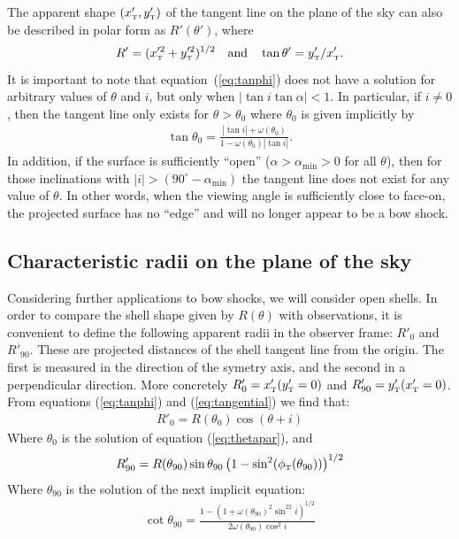 The apparent shape \((x'_{\mathrm{\scriptscriptstyle T}}, y'_{\mathrm{\scriptscriptstyle T}})\) of the tangent line on the plane
of the sky can also be described in polar form as \(R'(\theta')\),
where
\begin{equation}
  \label{eq:R-prime-theta-prime}
  R' = (x'^2_{\mathrm{\scriptscriptstyle T}}+ y'^2_{\mathrm{\scriptscriptstyle T}})^{1/2} 
  \quad \text{and} \quad
  \tan\theta' = y'_{\mathrm{\scriptscriptstyle T}} / x'_{\mathrm{\scriptscriptstyle T}}.
\end{equation}
It is important to note that equation~(\ref{eq:tanphi}) does not have
a solution for arbitrary values of $\theta$ and $i$, but only when
$|\tan i\tan\alpha|<1$. In particular, if $i\neq 0$, then the tangent
line only exists for \(\theta > \theta_{0}\) where \(\theta_{0}\) is
given implicitly by
\begin{align}
\tan\theta_{0} = \frac{|\tan i| + \omega(\theta_{0})}{1-\omega(\theta_{0}) |\tan i|} . 
\label{eq:thetapar}
\end{align}
In addition, if the surface is sufficiently ``open''
(\(\alpha > \alpha_{\mathrm{min}} > 0\) for all \(\theta\)), then for
those inclinations with
\(\vert i\vert > (90^\circ - \alpha_{\mathrm{min}}) \) the tangent
line does not exist for any value of \(\theta\).  In other words, when
the viewing angle is sufficiently close to face-on, the projected
surface has no ``edge'' and will no longer appear to be a bow shock.

\subsection{Characteristic radii on the plane of the sky}

Considering further applications to bow shocks, we will consider open shells. In order to compare the shell shape given by $R(\theta)$ with observations,
it is convenient to define the following apparent radii in the observer frame: $R'_{0}$ and $R'_{90}$. These are projected distances of the shell tangent line
from the origin. The first is measured in the direction of the symetry axis, and the second in a perpendicular direction. More concretely $R'_{0} = x'_{\mathrm{\scriptscriptstyle T}}(y'_{\mathrm{\scriptscriptstyle T}}=0)$
and $R'_{90} = y'_{\mathrm{\scriptscriptstyle T}}(x'_{\mathrm{\scriptscriptstyle T}}=0)$. From equations (\ref{eq:tanphi}) and (\ref{eq:tangential}) we find that:
\begin{align}
R'_{0} = R(\theta_{0})\cos(\theta + i) \label{eq:Rpar} 
\end{align}
Where $\theta_{0}$ is the solution of equation (\ref{eq:thetapar}), and
\begin{align}
R'_{90} = R(\theta_{90})\sin\theta_{90}\left(1-\sin^2(\phi_{\mathrm{\scriptscriptstyle T}}(\theta_{90}))\right)^{1/2}
\end{align}
Where $\theta_{90}$ is the solution of the next implicit equation:
\begin{align}
\cot\theta_{90} = \frac{1-\left(1+\omega(\theta_{90})^2\sin^22i\right)^{1/2}}{2\omega(\theta_{90})\cos^2 i}
\end{align}


